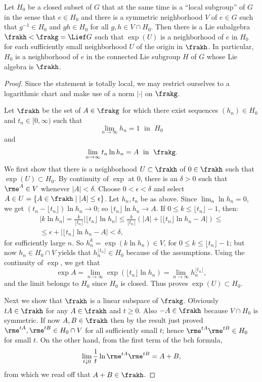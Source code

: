 \begin{thm}[{{\cite[Thm~1.10.6]{DK}}}]\label{thm 1.10.6 DK}
    Let $H_0$ be a closed subset of $G$ that at the same time is a ``local subgroup'' of $G$ in the sense that $e\in H_0$ and there is a symmetric neighborhood $V$ of $e\in G$ such that $g^{-1}\in H_0$ and $gh\in H_0$ for all $g,h\in V\cap H_0$. Then there is a Lie subalgebra $\frakh<\frakg=\Lief G$ such that $\exp(U)$ is a neighborhood of $e$ in $H_0$ for each sufficiently small neighborhood $U$ of the origin in $\frakh$. In particular, $H_0$ is a neighborhood of $e$ in the connected Lie subgroup $H$ of $G$ whose Lie algebra is $\frakh$.
\end{thm}
\begin{proof}
    Since the statement is totally local, we may restrict ourselves to a logarithmic chart and make use of a norm $|\cdot |$ on $\frakg$.

    Let $\frakh$ be the set of $A\in\frakg$ for which there exist sequences $(h_n)\in H_0$ and $t_n\in[0,\infty)$ such that 
    \[\lim_{n\to\infty} h_n=1\;\text{ in }\;H_0\] and 
    \[\lim_{n\to\infty} t_n \ln h_n=A\;\text{ in }\;\frakg.\]
    We first show that there is a neighborhood $U\subset \frakh$ of $0\in\frakh$ such that $\exp(U)\subset H_0$. By continuity of $\exp$ at $0$, there is an $\delta>0$ such that $\rme^A\in V$ whenever $|A|<\delta$. Choose $0<\epsilon<\delta$ and select $A\in U=\{A\in\frakh\mid |A|\leq \epsilon\}$. Let $h_n,t_n$ be as above. Since $\lim_n \ln h_n=0$, we get $(t_n-\lfloor t_n\rfloor)\ln h_n\to 0$; so $\lfloor t_n\rfloor \ln h_n\to A$. If $0\leq k\leq \lfloor t_n\rfloor -1$, then:
    \begin{multline}
        |k\ln h_n|=\frac{k}{\lfloor t_n\rfloor}|\lfloor t_n\rfloor \ln h_n|\leq 
    \frac{k}{\lfloor t_n\rfloor}(|A|+|\lfloor t_n\rfloor \ln h_n-A|)\leq \\
    \leq \epsilon+|\lfloor t_n\rfloor \ln h_n-A|<\delta,
    \end{multline}
    for sufficiently large $n$. So $h_n^k=\exp(k\ln h_n)\in V$, for $0\leq k\leq \lfloor t_n\rfloor -1$; but now $h_n\in H_0\cap V$ yields that $h_n^{\lfloor t_n\rfloor}\in H_0$ because of the assumptions. Using the continuity of $\exp$, we get that
    \[\exp A=\lim_{n\to \infty}\exp\left(\lfloor t_n\rfloor \ln h_n\right)=\lim_{n\to\infty} h_n^{\lfloor t_n\rfloor},\]
    and the limit belongs to $H_0$ since $H_0$ is closed. Thus proves $\exp(U)\subset H_0$.

    Next we show that $\frakh$ is a linear subspace of $\frakg$. Obviously $tA\in\frakh$ for any $A\in\frakh$ and $t\geq 0$. Also $-A\in\frakh$ because $V\cap H_0$ is symmetric. If now $A,B\in\frakh$ then by the result just proved $\rme^{tA},\rme^{tB}\in H_0\cap V$ for all sufficiently small $t$; hence $\rme^{tA}\rme^{tB}\in H_0$ for small $t$. On the other hand, from the first term of the \gls{bch} formula,
    \[\lim_{t\downarrow 0}\frac{1}{t} \ln \rme^{tA}\rme^{tB}=A+B,\]
    from which we read off that $A+B\in\frakh$.


\end{proof}
